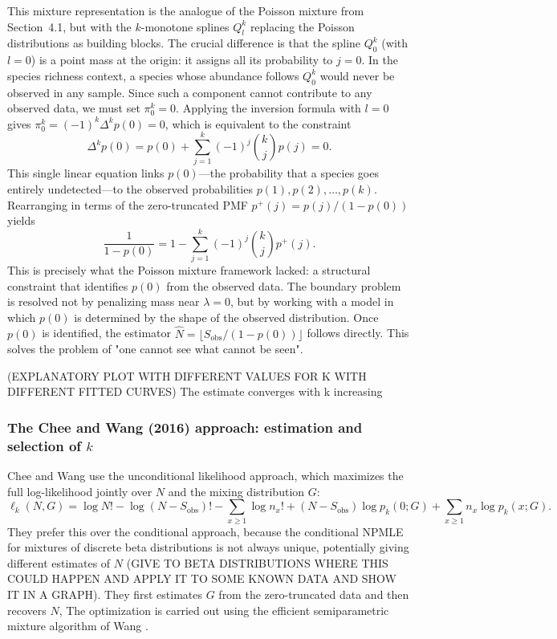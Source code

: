 \documentclass{article}
\begin{document}
{This mixture representation is the analogue of the Poisson mixture from Section~4.1, but with the $k$-monotone splines $Q^k_l$ replacing the Poisson distributions as building blocks. The crucial difference is that the spline $Q^k_0$ (with $l = 0$) is a point mass at the origin: it assigns all its probability to $j = 0$. In the species richness context, a species whose abundance follows $Q^k_0$ would never be observed in any sample. Since such a component cannot contribute to any observed data, we must set $\pi^k_0 = 0$. Applying the inversion formula with $l = 0$ gives $\pi^k_0 = (-1)^k \Delta^k p(0) = 0$, which is equivalent to the constraint
\[
\Delta^k p(0) = p(0) + \sum_{j=1}^{k} (-1)^j \binom{k}{j} p(j) = 0.
\]
This single linear equation links $p(0)$---the probability that a species goes entirely undetected---to the observed probabilities $p(1), p(2), \ldots, p(k)$. Rearranging in terms of the zero-truncated PMF $p^+(j) = p(j)/(1-p(0))$ yields
\[
\frac{1}{1 - p(0)} = 1 - \sum_{j=1}^{k} (-1)^j \binom{k}{j} p^+(j).
\]
This is precisely what the Poisson mixture framework lacked: a structural constraint that identifies $p(0)$ from the observed data. The boundary problem is resolved not by penalizing mass near $\lambda = 0$, but by working with a model in which $p(0)$ is determined by the shape of the observed distribution. Once $p(0)$ is identified, the estimator $\hat{N} = \lfloor S_{\mathrm{obs}} / (1 - p(0)) \rfloor$ follows directly. This solves the problem of "one cannot see what cannot be seen".

(EXPLANATORY PLOT WITH DIFFERENT VALUES FOR K WITH DIFFERENT FITTED CURVES)
The estimate converges with k increasing

\subsubsection{The Chee and Wang (2016) approach: estimation and selection of $k$}

Chee and Wang \cite{CheeWang2016} use the unconditional likelihood approach, which maximizes the full log-likelihood jointly over $N$ and the mixing distribution $G$:
\[
\ell_k(N, G) = \log N! - \log(N - S_{\mathrm{obs}})! 
- \sum_{x \geq 1} \log n_x! 
+ (N - S_{\mathrm{obs}}) \log p_k(0; G) 
+ \sum_{x \geq 1} n_x \log p_k(x; G).
\]
They prefer this over the conditional approach, because the conditional NPMLE for mixtures of discrete beta distributions is not always unique, potentially giving different estimates of $N$ (GIVE TO BETA DISTRIBUTIONS WHERE THIS COULD HAPPEN AND APPLY IT TO SOME KNOWN DATA AND SHOW IT IN A GRAPH). They first estimates $G$ from the zero-truncated data and then recovers $N$,  The optimization is carried out using the efficient semiparametric mixture algorithm of Wang \cite{Wang2010b}.

}
\end{document}
